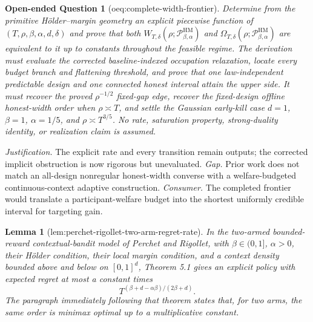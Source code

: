 \documentclass{article}
\newtheorem{lemma}{Lemma}
\newtheorem{openendedquestion}{Open-ended Question}
\begin{document}
\begin{openendedquestion}[oeq:complete-width-frontier]\label{oeq:complete-width-frontier}
Determine from the primitive H\"older--margin geometry an explicit piecewise function of \((T,\rho,\beta,\alpha,d,\delta)\) and prove that both \(W_{T,\delta}(\rho;\mathcal P_{\beta,\alpha}^{\mathrm{HM}})\) and \(\Omega_{T,\delta}(\rho;\mathcal P_{\beta,\alpha}^{\mathrm{HM}})\) are equivalent to it up to constants throughout the feasible regime.  The derivation must evaluate the corrected baseline-indexed occupation relaxation, locate every budget branch and flattening threshold, and prove that one law-independent predictable design and one connected honest interval attain the upper side.  It must recover the proved \(\rho^{-1/2}\) fixed-gap edge, recover the fixed-design offline honest-width order when \(\rho\asymp T\), and settle the Gaussian early-kill case \(d=1\), \(\beta=1\), \(\alpha=1/5\), and \(\rho\asymp T^{3/5}\).  No rate, saturation property, strong-duality identity, or realization claim is assumed.
\end{openendedquestion}
\par\smallskip\noindent \textit{Justification.} The explicit rate and every transition remain outputs; the corrected implicit obstruction is now rigorous but unevaluated. \textit{Gap.} Prior work does not match an all-design nonregular honest-width converse with a welfare-budgeted continuous-context adaptive construction. \textit{Consumer.} The completed frontier would translate a participant-welfare budget into the shortest uniformly credible interval for targeting gain.

\begin{lemma}[lem:perchet-rigollet-two-arm-regret-rate]\label{lem:perchet-rigollet-two-arm-regret-rate}
In the two-armed bounded-reward contextual-bandit model of Perchet and Rigollet, with \(\beta\in(0,1]\), \(\alpha>0\), their H\"older condition, their local margin condition, and a context density bounded above and below on \([0,1]^d\), Theorem 5.1 gives an explicit policy with expected regret at most a constant times
\[
T^{(\beta+d-\alpha\beta)/(2\beta+d)}.
\]
The paragraph immediately following that theorem states that, for two arms, the same order is minimax optimal up to a multiplicative constant.
\end{lemma}
\end{document}
